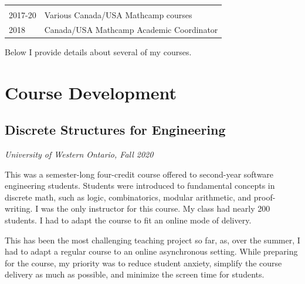 \documentclass[
]{report}
\begin{document}
\begin{longtable}[]{@{}ll@{}}
\begin{minipage}[t]{0.37\columnwidth}\raggedright
\strut
\end{minipage} & \begin{minipage}[t]{0.57\columnwidth}\raggedright
\strut
\end{minipage}\tabularnewline
\begin{minipage}[t]{0.37\columnwidth}\raggedright
2017-20\strut
\end{minipage} & \begin{minipage}[t]{0.57\columnwidth}\raggedright
Various Canada/USA Mathcamp courses\strut
\end{minipage}\tabularnewline
\begin{minipage}[t]{0.37\columnwidth}\raggedright
2018\strut
\end{minipage} & \begin{minipage}[t]{0.57\columnwidth}\raggedright
Canada/USA Mathcamp Academic Coordinator\strut
\end{minipage}\tabularnewline
\bottomrule
\end{longtable}

Below I provide details about several of my courses.

\hypertarget{course-development}{%
\chapter{Course Development}\label{course-development}}

\hypertarget{discrete-structures-for-engineering}{%
\section{Discrete Structures for Engineering}\label{discrete-structures-for-engineering}}

\emph{University of Western Ontario, Fall 2020}

This was a semester-long four-credit course offered to second-year software engineering students. Students were introduced to fundamental concepts in discrete math, such as logic, combinatorics, modular arithmetic, and proof-writing. I was the only instructor for this course. My class had nearly 200 students. I had to adapt the course to fit an online mode of delivery.

This has been the most challenging teaching project so far, as, over the summer, I had to adapt a regular course to an online asynchronous setting. While preparing for the course, my priority was to reduce student anxiety, simplify the course delivery as much as possible, and minimize the screen time for students.
\end{document}
